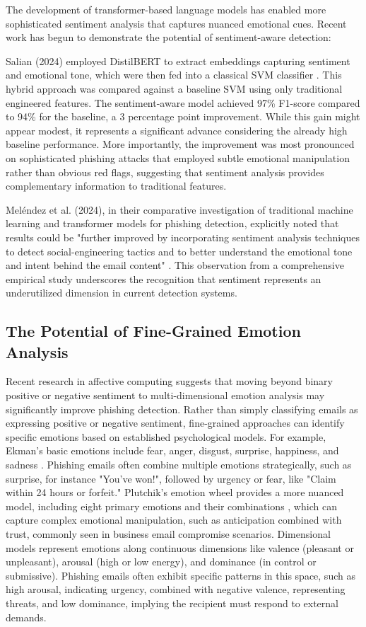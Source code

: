 The development of transformer-based language models has enabled more sophisticated sentiment analysis that captures nuanced emotional cues. Recent work has begun to demonstrate the potential of sentiment-aware detection:

Salian (2024) employed \ac{DistilBERT} to extract embeddings capturing sentiment and emotional tone, which were then fed into a classical \ac{SVM} classifier \cite{salian2024enhancing}. This hybrid approach was compared against a baseline \ac{SVM} using only traditional engineered features. The sentiment-aware model achieved 97\% F1-score compared to 94\% for the baseline, a 3 percentage point improvement. While this gain might appear modest, it represents a significant advance considering the already high baseline performance. More importantly, the improvement was most pronounced on sophisticated phishing attacks that employed subtle emotional manipulation rather than obvious red flags, suggesting that sentiment analysis provides complementary information to traditional features.

Meléndez et al. (2024), in their comparative investigation of traditional machine learning and transformer models for phishing detection, explicitly noted that results could be "further improved by incorporating sentiment analysis techniques to detect social-engineering tactics and to better understand the emotional tone and intent behind the email content" \cite{electronics13244877}. This observation from a comprehensive empirical study underscores the recognition that sentiment represents an underutilized dimension in current detection systems.

\subsection{The Potential of Fine-Grained Emotion Analysis}

Recent research in affective computing suggests that moving beyond binary positive or negative sentiment to multi-dimensional emotion analysis may significantly improve phishing detection. Rather than simply classifying emails as expressing positive or negative sentiment, fine-grained approaches can identify specific emotions based on established psychological models. For example, Ekman's basic emotions include fear, anger, disgust, surprise, happiness, and sadness \cite{ekman1992argument}. Phishing emails often combine multiple emotions strategically, such as surprise, for instance "You've won!", followed by urgency or fear, like "Claim within 24 hours or forfeit." Plutchik's emotion wheel provides a more nuanced model, including eight primary emotions and their combinations \cite{plutchik2001nature}, which can capture complex emotional manipulation, such as anticipation combined with trust, commonly seen in business email compromise scenarios. Dimensional models represent emotions along continuous dimensions like valence (pleasant or unpleasant), arousal (high or low energy), and dominance (in control or submissive). Phishing emails often exhibit specific patterns in this space, such as high arousal, indicating urgency, combined with negative valence, representing threats, and low dominance, implying the recipient must respond to external demands.

